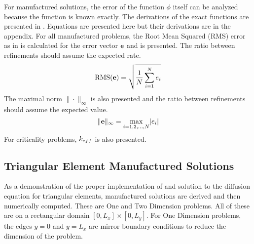   For manufactured solutions, the error of the function $\phi$ itself can be 
  analyzed because the function is known exactly. The derivations of the exact 
  functions are presented in . Equations are 
  presented here but their derivations are in the appendix. For all manufactured 
  problems, the Root Mean Squared (RMS) error as in  is calculated
  for the error vector $\mathbf{e}$ and is presented. The ratio between refinements 
  should assume the expected rate.
  \begin{equation} \label{eq:rms}
    \text{RMS}(\mathbf{e}) = \sqrt{\frac{1}{N} \sum_{i=1}^{N} e_i}
  \end{equation}
  The maximal norm $\| \cdot \|_{\infty}$ is also presented and the ratio 
  between refinements should assume the expected value.
  \begin{equation} \label{eq:infnorm}
    \|\mathbf{e}\|_{\infty} = \max_{i=1,2,\ldots,N} \lvert e_i \rvert
  \end{equation}
  For criticality  problems, $k_{eff}$ is also presented.
  
  \subsection{Triangular Element Manufactured Solutions}
    As a demonstration of the proper implementation of and solution to the 
    diffusion equation for triangular elements, manufactured solutions are 
    derived and then numerically computed. These are One and Two Dimension 
    problems. All of these are on a rectangular domain $[0,L_x] \times [0,L_y]$.
    For One Dimension problems, the edges $y=0$ and $y=L_x$ are mirror boundary 
    conditions to reduce the dimension of the problem.
